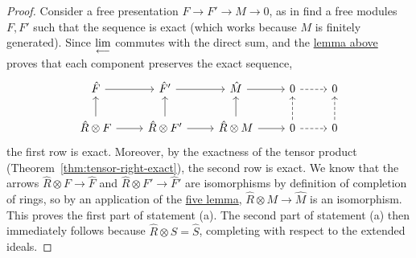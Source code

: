 \begin{proof}
    Consider a free presentation \(F \to F' \to M \to 0\),
    as in find a free modules \(F,F'\) such that the sequence is exact
    (which works because \(M\) is finitely generated).
    Since \(\operatorname{\displaystyle\lim_{\longleftarrow}}\) commutes with the direct sum,
    and the \hyperref[lem:m-adic-invlim-exact]{lemma above} proves that each component preserves the exact sequence,
    \begin{equation*}
        \begin{tikzcd}
            \hat{F} \arrow{r} & \hat{F}' \arrow{r} & \hat{M} \arrow{r} & 0 \arrow[dashrightarrow]{r} & 0 \\
            \hat{R} \otimes F \arrow{r} \arrow{u} & \hat{R} \otimes F' \arrow{r} \arrow{u} &
            \hat{R} \otimes M \arrow{r} \arrow{u} & 0 \arrow[dashrightarrow]{r} \arrow[dashrightarrow]{u} & 0 \arrow[dashrightarrow]{u}
        \end{tikzcd}
    \end{equation*}
    the first row is exact.
    Moreover, by the exactness of the tensor product (Theorem~\ref{thm:tensor-right-exact}),
    the second row is exact.
    We know that the arrows \(\hat{R} \otimes F \to \hat{F}\) and \(\hat{R} \otimes F' \to \hat{F}'\)
    are isomorphisms by definition of completion of rings,
    so by an application of the \hyperref[lem:five]{five lemma},
    \(\hat{R} \otimes M \to \hat{M}\) is an isomorphism.
    This proves the first part of statement (a).
    The second part of statement (a) then immediately follows because \(\hat{R} \otimes S = \hat{S}\),
    completing with respect to the extended ideals.


\end{proof}

